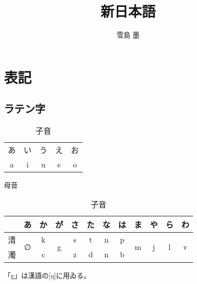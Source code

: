 \documentclass[]{jlreq}
\title{新日本語}
\author{雪島 墨}
\begin{document}
\maketitle

\section{表記}
\subsection{ラテン字}
\begin{table}[h]
  \begin{minipage}{.5\linewidth}\centering
    \begin{tabular}{ccccc}
      あ & い & う & え & お \\
      a  & i  & u  & e  & o
    \end{tabular}
    \caption{母音}
  \end{minipage}%
  \begin{minipage}{.5\linewidth}\centering
    \begin{tabular}{r|ccccccccccc}
         & あ                 & か & か゚                 & さ & た & な & は & ま                 & や                 & ら                 & わ                 \\
      \hline
      清 & \multirow{2}{*}{∅} & k  & \multirow{2}{*}{g} & s  & t  & n  & p  & \multirow{2}{*}{m} & \multirow{2}{*}{j} & \multirow{2}{*}{l} & \multirow{2}{*}{v} \\
      濁 &                    & c  &                    & z  & d  & n  & b  &                    &                    &                    &
    \end{tabular}
    \caption{子音}
  \end{minipage}
\end{table}

「g」は漢語の[ŋ]に用ゐる。
\end{document}
